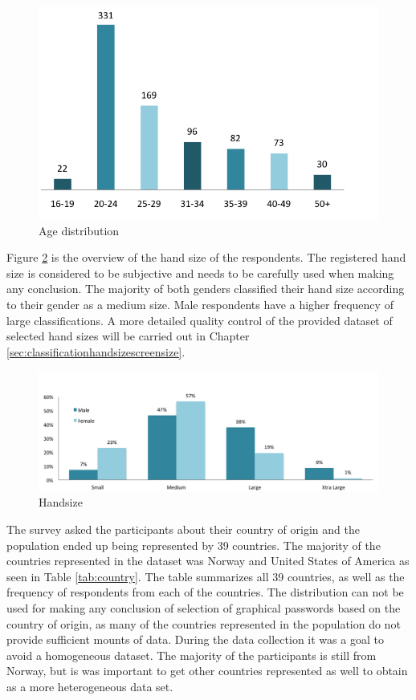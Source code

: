     \begin{figure}[H]
      \centering
      \includegraphics[scale=0.8]{pics/analysis/AgeDist.png}
      \caption{Age distribution}
      \label{fig:ageDistribution}
    \end{figure}

    Figure  \ref{fig:handsizepopulation} is the overview of the hand size of the respondents. The registered hand size is considered to be subjective and needs to be carefully used when making any conclusion. The majority of both genders classified their hand size according to their gender as a medium size. Male respondents have a higher frequency of large classifications. A more detailed quality control of the provided dataset of selected hand sizes will be carried out in Chapter \ref{sec:classificationhandsizescreensize}.

    \begin{figure}[H]
      \centering
      \includegraphics[width=\textwidth]{pics/infographics/mobilesize.png}
      \caption{Handsize}
      \label{fig:handsizepopulation}
    \end{figure}

    The survey asked the participants about their country of origin and the population ended up being represented by 39 countries. The majority of the countries represented in the dataset was Norway and United States of America as seen in Table \ref{tab:country}. The table summarizes all 39 countries, as well as the frequency of respondents from each of the countries. The distribution can not be used for making any conclusion of selection of graphical passwords based on the country of origin, as many of the countries represented in the population do not provide sufficient mounts of data. During the data collection it was a goal to avoid a homogeneous dataset. The majority of the participants is still from Norway, but is was important to get other countries represented as well to obtain as a more heterogeneous data set.  

